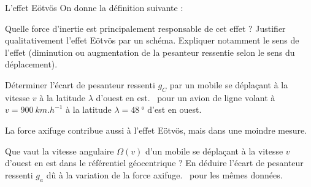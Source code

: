 \begin{exo}[PC][1][colle]{L’effet Eötvös}
  On donne la définition suivante :
  \begin{center}
    \emph{
   }
  \end{center}
  \begin{quest}
    \item	Quelle force d'inertie est principalement responsable de cet effet ? Justifier qualitativement l'effet Eötvös par un schéma. Expliquer notamment le sens de l’effet (diminution ou augmentation de la pesanteur ressentie selon le sens du déplacement).
    \item Déterminer l’écart de pesanteur ressenti $g_{C}$ par un mobile se déplaçant à la vitesse $v$ à la latitude $\lambda$ d’ouest en est. \AN~pour un avion de ligne volant à $v=\SI{900}{km.h^{-1}}$ à la latitude $\lambda=\SI{48}{\degree}$ d’est en ouest.
  \end{quest}
La force axifuge contribue aussi à l’effet Eötvös, mais dans une moindre mesure.
\begin{quest}
  \item	Que vaut la vitesse angulaire $\Omega(v)$ d’un mobile se déplaçant à la vitesse $v$ d’ouest en est dans le référentiel géocentrique ? En déduire l’écart de pesanteur ressenti $g_{a}$ dû à la variation de la force axifuge. \AN~pour les mêmes données.
\end{quest}
\end{exo}

